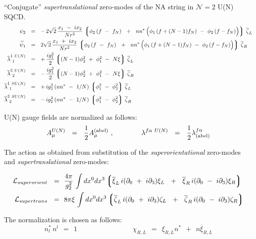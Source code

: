 \documentclass{letter}
\newcommand{\p}{\partial}
\newcommand{\wt}{\widetilde}
\newcommand{\ov}{\overline}
\newcommand{\mc}[1]{\mathcal{#1}}
\newcommand{\lgr}{\left\lgroup}
\newcommand{\rgr}{\right\rgroup}
\begin{document}
 ``Conjugate'' {\it supertranslational} zero-modes of the NA string in ${\mathcal N}=2$ U(N) SQCD.
\begin{align*}
%
\psi_{2}	& ~~=~~  -\,  2\sqrt{2}\, \frac{x_1 ~-~ i x_2}{N r^2} \,
		\lgr \phi_2\, (f ~-~ f_N) ~~+~~
			n n^*\, \Bigl( \phi_1\,( f + (N-1) f_N) ~-~ \phi_2\, (f - f_N) \Bigr) 
		\rgr\, \ov{\zeta}_L 
		\\
%
\wt{\psi}_{1} & ~~=~~    2\sqrt{2} \, \frac{x_1 ~+~ i x_2}{N r^2} \,
		\lgr \phi_2\, (f ~-~ f_N) ~~+~~
			n n^*\, \Bigl( \phi_1\,( f + (N-1) f_N) ~-~ \phi_2\, (f - f_N) \Bigr) 
		\rgr\, \ov{\zeta}_R
		\\
%
\ov{\lambda}^{\dot{1}\ U(N)}_{\ 1} 	& ~~=~~ +\, \frac{i g_1^2}{2} \lgr (N-1)\phi_2^2  ~+~ \phi_1^2 ~-~ N\xi \rgr \, \ov{\zeta}_L 
		\\
%
\ov{\lambda}^{\dot{2}\ U(N)}_{\ 2} 	& ~~=~~ -\, \frac{i g_1^2}{2} \lgr (N-1)\phi_2^2  ~+~ \phi_1^2 ~-~ N\xi \rgr \, \ov{\zeta}_R 
		\\
%
\ov{\lambda}^{\dot{1}\ SU(N)}_{\ 1}	& ~~=~~ +\, {i g_2^2}\, ( nn^* ~-~ 1/N )\, \lgr \phi_1^2 ~-~ \phi_2^2 \rgr\, \ov{\zeta}_L
		\\
%
\ov{\lambda}^{\dot{2}\ SU(N)}_{\ 2}	& ~~=~~ -\, {i g_2^2}\, ( nn^* ~-~ 1/N )\, \lgr \phi_1^2 ~-~ \phi_2^2 \rgr\, \ov{\zeta}_R
\end{align*}

	U(N) gauge fields are normalized as follows:
\[
	A^{U(N)}_\mu ~~=~~ \frac 1 2 A^{\rm (abel)}_\mu ~, 
	\qquad\qquad   \lambda^{f\alpha\ U(N)} ~~=~~ \frac 1 2 \lambda^{f\alpha}_{\rm (abel)}
\]

\pagebreak
	The action as obtained from substitution of the {\it superorientational} zero-modes and
	{\it supertranslational} zero-modes:

\begin{align*}
%
\mc{L}_{superorient} ~~=~~ &
	\frac{4\pi}{g_2^2}\,
	\int dx^0 dx^3 
	\left\lgroup 
	\ov{\xi}_L \, i (\p_0 ~+~ i \p_3 ) \xi_L ~~+~~ \ov{\xi}_R \, i (\p_0 ~-~ i \p_3 ) \xi_R 
	\right\rgroup 
	\\
%
\mc{L}_{supertrans} ~~=~~ &
	8 \pi \xi\,
	\int dx^0 dx^3
	\lgr
		\ov{\zeta}_L \, i (\p_0 ~+~ i \p_3 ) \zeta_L ~~+~~ 
		\ov{\zeta}_R \, i (\p_0 ~-~ i \p_3 ) \zeta_R 
	\rgr
\end{align*}

The normalization is chosen as follows:
\[
	n^{*}_l \, n^l ~~=~~ 1 \qquad\qquad\qquad\qquad \chi_{R,L} ~~=~~ \xi_{R,L} n^* ~~+~~ n \ov{\xi}_{R,L}
\]
\end{document}
